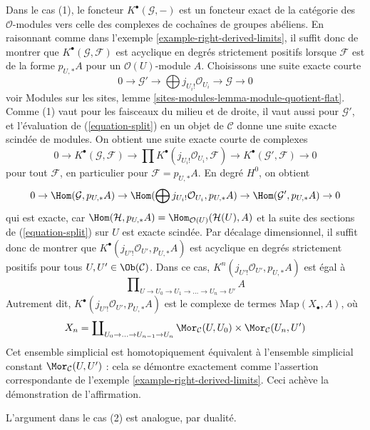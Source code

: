 \begin{example}
Dans le cas (1), le foncteur $K^\bullet(\mathcal{G}, -)$ est un foncteur exact
de la catégorie des $\mathcal{O}$-modules vers celle des complexes de
cochaînes de groupes abéliens. En raisonnant comme dans l'exemple
\ref{example-right-derived-limits}, il suffit donc de montrer que
$K^\bullet(\mathcal{G}, \mathcal{F})$ est acyclique en degrés strictement
positifs lorsque $\mathcal{F}$ est de la forme $p_{U, *}A$ pour un
$\mathcal{O}(U)$-module $A$.
Choisissons une suite exacte courte
\begin{equation}
\label{equation-split}
0 \to \mathcal{G}' \to \bigoplus j_{U_i!}\mathcal{O}_{U_i} \to
\mathcal{G} \to 0
\end{equation}
voir Modules sur les sites, lemme
\ref{sites-modules-lemma-module-quotient-flat}. Comme (1) vaut pour les
faisceaux du milieu et de droite, il vaut aussi pour $\mathcal{G}'$, et
l'évaluation de (\ref{equation-split}) en un objet de $\mathcal{C}$ donne une
suite exacte scindée de modules. On obtient une suite exacte courte de
complexes
$$
0 \to
K^\bullet(\mathcal{G}, \mathcal{F}) \to
\prod K^\bullet(j_{U_i!}\mathcal{O}_{U_i}, \mathcal{F}) \to
K^\bullet(\mathcal{G}', \mathcal{F}) \to 0
$$
pour tout $\mathcal{F}$, en particulier pour
$\mathcal{F} = p_{U, *}A$. En degré $H^0$, on obtient
$$
0 \to \Hom(\mathcal{G}, p_{U, *}A) \to
\Hom(\bigoplus j_{U_i!}\mathcal{O}_{U_i}, p_{U, *}A) \to
\Hom(\mathcal{G}', p_{U, *}A) \to 0
$$
qui est exacte, car
$\Hom(\mathcal{H}, p_{U, *}A) = \Hom_{\mathcal{O}(U)}(\mathcal{H}(U), A)$
et la suite des sections de (\ref{equation-split}) sur $U$ est exacte
scindée. Par décalage dimensionnel, il suffit donc de montrer que
$K^\bullet(j_{U'!}\mathcal{O}_{U'}, p_{U, *}A)$ est acyclique en degrés
strictement positifs pour tous $U, U' \in \Ob(\mathcal{C})$. Dans ce cas,
$K^n(j_{U'!}\mathcal{O}_{U'}, p_{U, *}A)$ est égal à
$$
\prod\nolimits_{U \to U_0 \to U_1 \to \ldots \to U_n \to U'} A
$$
Autrement dit, $K^\bullet(j_{U'!}\mathcal{O}_{U'}, p_{U, *}A)$ est le
complexe de termes $\text{Map}(X_\bullet, A)$, où
$$
X_n = \coprod\nolimits_{U_0 \to \ldots \to U_{n - 1} \to U_n}
\Mor_\mathcal{C}(U, U_0) \times \Mor_\mathcal{C}(U_n, U')
$$
Cet ensemble simplicial est homotopiquement équivalent à l'ensemble
simplicial constant $\Mor_\mathcal{C}(U, U')$ : cela se démontre exactement
comme l'assertion correspondante de l'exemple
\ref{example-right-derived-limits}. Ceci achève la démonstration de
l'affirmation.

\medskip\noindent
L'argument dans le cas (2) est analogue, par dualité.
\end{example}







